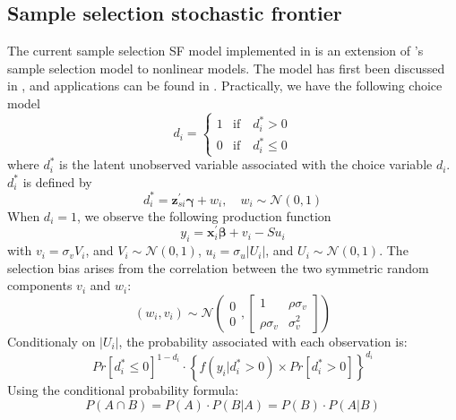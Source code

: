 \documentclass[nojss]{jss}
\begin{document}
\subsection{Sample selection stochastic frontier} \label{subsec:ss}

The current sample selection SF model implemented in  is an extension 
of \citet{heck76, heck79}'s sample selection model to nonlinear models. The model 
has first been discussed in \citet{greeneSS}, and applications can be found 
in \citet{bravo20, dakpo22}. Practically, we have the following choice model
%
\begin{equation}\label{eq:3.1.1}
d_{i} =  \begin{cases}
1 & \text{if} \quad d_{i}^* > 0  \\
0 & \text{if} \quad d_{i}^* \leq 0
\end{cases}
\end{equation}
%
where $d_{i}^*$ is the latent unobserved variable associated with the choice 
variable $d_i$. $d_{i}^*$ is defined by
%
\begin{equation}\label{eq:3.1.2}
d_{i}^* = \mathbf{z}_{si}^{\prime} \mathbf{\gamma} + w_i, \quad w_i \sim \mathcal{N}(0, 1)
\end{equation}
%
When $d_i = 1$, we observe the following production function
%
\begin{equation}\label{eq:3.1.3}
y_{i} = \mathbf{x}_{i}^{\prime} \mathbf{\beta} + v_i - Su_i 
\end{equation}
%
with $v_i = \sigma_vV_i$, and $V_i \sim \mathcal{N}(0, 1)$, $u_i = \sigma_u|U_i|$, 
and $U_i \sim \mathcal{N}(0, 1)$. The selection bias arises from the correlation 
between the two symmetric random components $v_i$ and $w_i$:
%
$$(w_i, v_i) \sim \mathcal{N}\left(\begin{matrix} 0 \\ 0 \end{matrix}, \begin{bmatrix} 1 & \rho \sigma_v \\ 
\rho \sigma_v & \sigma_v^2 \end{bmatrix} \right)$$
%
Conditionaly on $|U_i|$, the probability associated with each observation is:
 \begin{equation}\label{eq:3.1.4}
 Pr \left[d_{i}^* \leq 0 \right]^{1-d_{i}} \cdot \left\{ 
 f(y_{i}|d_{i}^* > 0) \times Pr\left[ d_{i}^* > 0 
 \right] \right\}^{d_{i}}
 \end{equation}
 Using the conditional probability formula:
 $$P\left(A\cap B\right) = P(A) \cdot P(B|A) = P(B) \cdot P(A|B)$$
\end{document}
